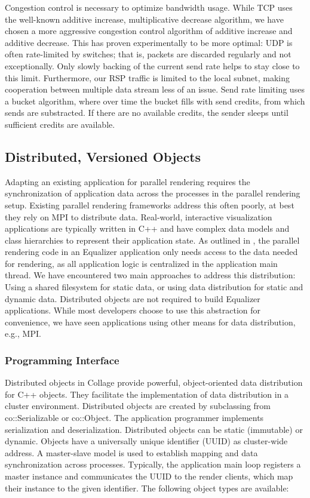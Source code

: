 \documentclass[10pt,journal,compsoc]{IEEEtran}
\begin{document}
Congestion control is necessary to optimize bandwidth usage. While TCP uses the
well-known additive increase, multiplicative decrease algorithm, we have chosen
a more aggressive congestion control algorithm of additive increase and additive
decrease. This has proven experimentally to be more optimal: UDP is often
rate-limited by switches; that is, packets are discarded regularly and not
exceptionally. Only slowly backing of the current send rate helps to stay close
to this limit. Furthermore, our RSP traffic is limited to the local subnet,
making cooperation between multiple data stream less of an issue. Send rate
limiting uses a bucket algorithm, where over time the bucket fills with send
credits, from which sends are substracted. If there are no available credits,
the sender sleeps until sufficient credits are available.

\subsection{Distributed, Versioned Objects}

Adapting an existing application for parallel rendering requires the
synchronization of application data across the processes in the parallel
rendering setup. Existing parallel rendering frameworks address this often
poorly, at best they rely on MPI to distribute data. Real-world, interactive
visualization applications are typically written in C++ and have complex data
models and class hierarchies to represent their application state. As outlined
in \cite{EMP:09}, the parallel rendering code in an \textsf{Equalizer}
application only needs access to the data needed for rendering, as all
application logic is centralized in the application main thread. We have
encountered two main approaches to address this distribution: Using a shared
filesystem for static data, or using data distribution for static and dynamic
data. Distributed objects are not required to build \textsf{Equalizer}
applications. While most developers choose to use this abstraction for
convenience, we have seen applications using other means for data distribution,
e.g., MPI.

\subsubsection{Programming Interface}

Distributed objects in \textsf{Collage} provide powerful, object-oriented data
distribution for C++ objects. They facilitate the implementation of data
distribution in a cluster environment. Distributed objects are created by
subclassing from \textsf{co::Serializable} or \textsf{co::Object}. The
application programmer implements serialization and deserialization. Distributed
objects can be static (immutable) or dynamic. Objects have a universally unique
identifier (UUID) as cluster-wide address. A master-slave model is used to
establish mapping and data synchronization across processes. Typically, the
application main loop registers a master instance and communicates the UUID to
the render clients, which map their instance to the given identifier. The
following object types are available:
\end{document}
